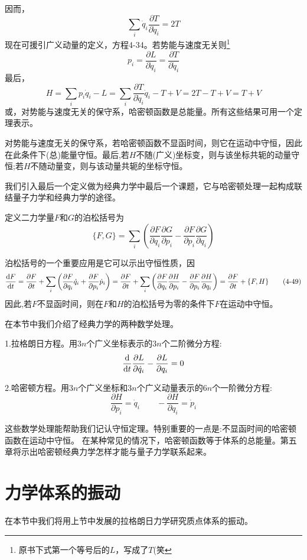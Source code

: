 因而，
\[\sum_i \dot{q}_i\frac{\partial T}{\partial \dot{q}_i}=2T \tag{4-45}\]
现在可援引广义动量的定义，方程4-34。若势能与速度无关则\footnote{原书下式第一个等号后的$L$，写成了$T$(笑}
\[p_i=\frac{\partial L}{\partial \dot{q}_i}=\frac{\partial T}{\partial \dot{q}_i} \tag{4-46}\]
最后，
\[H=\sum_ip_i\dot{q}_i-L=\sum_i\frac{\partial T}{\partial \dot{q}_i}\dot{q}_i-T+V=2T-T+V=T+V \tag{4-47}\]
或，对势能与速度无关的保守系，哈密顿函数是总能量。所有这些结果可用一个定理表示。
\begin{theorem}
对势能与速度无关的保守系，若哈密顿函数不显函时间，则它在运动中守恒，因此在此条件下(总)能量守恒。最后,若$H$不随(广义)坐标变，则与该坐标共轭的动量守恒;若$H$不随动量变，则与该动量共轭的坐标守恒。
\end{theorem}

我们引入最后一个定义做为经典力学中最后一个课题，它与哈密顿处理一起构成联结量子力学和经典力学的途径。
\begin{definition}[泊松括号]
    定义二力学量$F$和$G$的泊松括号为
    \[\{F,G\}=\sum_i\left (\frac{\partial F}{\partial q_i}\frac{\partial G}{\partial p_i}-\frac{\partial F}{\partial p_i}\frac{\partial G}{\partial q_i}\right ) \tag{4-48}\]    
\end{definition}
泊松括号的一个重要应用是它可以示出守恒性质，因
\[\dv{F}{t}=\frac{\partial F}{\partial t}+\sum_i\left(\frac{\partial F}{\partial q_i}\dot{q}_i+\frac{\partial F}{\partial p_i}\dot{p}_i\right)
=\frac{\partial F}{\partial t}+\sum_i\left (\frac{\partial F}{\partial q_i}\frac{\partial H}{\partial p_i}-\frac{\partial F}{\partial p_i}\frac{\partial H}{\partial q_i}\right )=\frac{\partial F}{\partial t}+\{F,H\} \tag{4-49}\]
因此,若$F$不显函时间，则在$F$和$H$的泊松括号为零的条件下$F$在运动中守恒。

在本节中我们介绍了经典力学的两种数学处理。

1.拉格朗日方程。用$3n$个广义坐标表示的$3n$个二阶微分方程:
\[\dv{t}\frac{\partial L}{\partial \dot{q}_i}-\frac{\partial L}{\partial q_i}=0\]

2.哈密顿方程。用$3n$个广义坐标和$3n$个广义动量表示的$6n$个一阶微分方程:
\[\frac{\partial H}{\partial p_i}=\dot{q}_i \qquad -\frac{\partial H}{\partial q_i}=\dot{p}_i\]

这些数学处理能帮助我们记认守恒定理。特别重要的一点是:不显函时间的哈密顿函数在运动中守恒。
在某种常见的情况下，哈密顿函数等于体系的总能量。第五章将示出哈密顿经典力学怎样才能与量子力学联系起来。

\section{力学体系的振动}
在本节中我们将用上节中发展的拉格朗日力学研究质点体系的振动。

